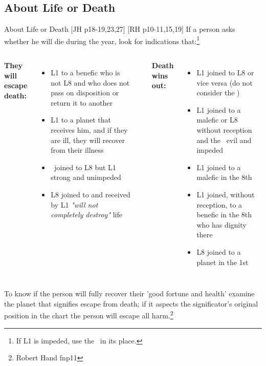 \subsection{About Life or Death}
\begin{frame}[t]{About Life or Death [JH p18-19,23,27] [RH p10-11,15,19]}
If a person asks whether he will die during the year, look for indications that:\footnote{If L1 is impeded, use the \Moon\ in its place.}
\vspace{0.25cm}
\begin{columns}[T, onlytextwidth]
\textbf{They will escape death:}\\
\begin{itemize}
\item L1 to a benefic who is not L8 and who does not pass on disposition or return it to another 
\vspace{0.25cm}

\item L1 to a planet that receives him, and if they are ill, they will recover from their illness
\vspace{0.25cm}

\item \Moon\ joined to L8 but L1 strong and unimpeded
\item L8 joined to and received by L1 \textsl{"will not completely destroy"} life
\end{itemize}

\rule{.1mm}{.45\textheight}

\textbf{Death wins out:}\\
\begin{itemize}
\item L1 joined to L8 or vice versa (do not consider the \Moon) 
\item L1 joined to a malefic or L8 without reception and the \Moon\ evil and impeded
\item L1 joined to a malefic in the 8th
\item L1 joined, without reception, to a benefic in the 8th who has dignity there
\item L8 joined to a planet in the 1st
\end{itemize}
\end{columns}
\vspace{0.25cm}
To know if the person will fully recover their  'good fortune and health' examine the planet that signifies escape from death; if it aspects the significator's original position in the chart the person will escape all harm.\footnote{Robert Hand fnp11}
\end{frame}
